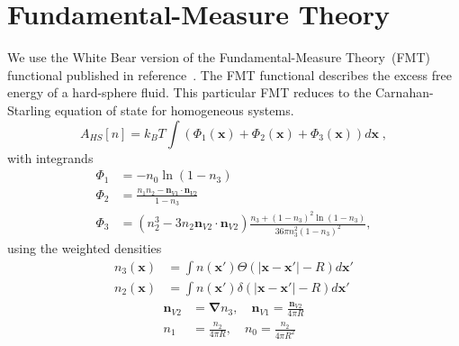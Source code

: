 \documentclass[letterpaper,twocolumn,amsmath,amssymb,prb]{revtex4-1}
\newcommand{\xx}{\textbf{x}}
\begin{document}
\section{Fundamental-Measure Theory}

We use the White Bear version of the Fundamental-Measure Theory~(FMT)
functional published in reference~\cite{roth2002whitebear}.  The FMT
functional describes the excess free energy of a hard-sphere fluid.
This particular FMT reduces to the Carnahan-Starling equation of state
for homogeneous systems.
\begin{equation}
A_\textit{HS}[n] = k_B T \int \left(\Phi_1(\xx) + \Phi_2(\xx) + \Phi_3(\xx)\right) d\xx \; ,
\end{equation}
with integrands
\begin{align}
\Phi_1 &= -n_0 \ln\left( 1 - n_3\right)\\
\Phi_2 &= \frac{n_1 n_2 - \mathbf{n}_{V1} \cdot\mathbf{n}_{V2}}{1-n_3} \\
\Phi_3 &= (n_2^3 - 3 n_2 \mathbf{n}_{V2} \cdot \mathbf{n}_{V2}) \frac{
  n_3 + (1-n_3)^2 \ln(1-n_3)
}{
  36\pi n_3^2\left( 1 - n_3 \right)^2
} ,
\end{align}
using the weighted densities
\begin{align}
  n_3(\xx) &= \int n(\xx') \Theta(\left|\xx - \xx'\right| - R) d\xx' \\
  n_2(\xx) &= \int n(\xx') \delta(\left|\xx - \xx'\right| - R) d\xx'
\end{align}
\begin{align}
  \mathbf{n}_{V2} &= \mathbf{\nabla} n_3 , \quad
  \mathbf{n}_{V1} = \frac{\mathbf{n}_{V2}}{4\pi R} \\
  n_1 &= \frac{n_2}{4\pi R} , \quad
  n_0 = \frac{n_2}{4\pi R^2}
\end{align}
\end{document}
